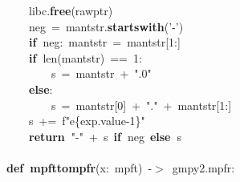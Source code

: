 \documentclass{article}\usepackage[]{graphicx}\usepackage[dvipsnames,table]{xcolor}
\makeatletter
\newcommand{\hlnum}[1]{\textcolor[rgb]{0.686,0.059,0.569}{#1}}%
\newcommand{\hlsng}[1]{\textcolor[rgb]{0.192,0.494,0.8}{#1}}%
\newcommand{\hlopt}[1]{\textcolor[rgb]{0,0,0}{#1}}%
\newcommand{\hldef}[1]{\textcolor[rgb]{0.345,0.345,0.345}{#1}}%
\newcommand{\hlkwa}[1]{\textcolor[rgb]{0.161,0.373,0.58}{\textbf{#1}}}%
\newcommand{\hlkwb}[1]{\textcolor[rgb]{0.69,0.353,0.396}{#1}}%
\newcommand{\hlkwd}[1]{\textcolor[rgb]{0.737,0.353,0.396}{\textbf{#1}}}%
\let\hlipl\hlkwb
\newenvironment{kframe}{%
 \def\at@end@of@kframe{}%
 \ifinner\ifhmode%
  \def\at@end@of@kframe{\end{minipage}}%
  \begin{minipage}{\columnwidth}%
 \fi\fi%
 \def\FrameCommand##1{\hskip\@totalleftmargin \hskip-\fboxsep
 \colorbox{shadecolor}{##1}\hskip-\fboxsep
     \hskip-\linewidth \hskip-\@totalleftmargin \hskip\columnwidth}%
 \MakeFramed {\advance\hsize-\width
   \@totalleftmargin\z@ \linewidth\hsize
   \@setminipage}}%
 {\par\unskip\endMakeFramed%
 \at@end@of@kframe}
\newenvironment{knitrout}{}{} %
\makeatother
\begin{document}
\begin{center}
\begin{minipage}[m]{15cm}
\begin{knitrout}
\begin{kframe}
\hldef{}\hldef{\ \ \ \ }\hldef{\textunderscore libc}\hlopt{.}\hldef{}\hlkwd{free}\hldef{}\hlopt{(}\hldef{raw\textunderscore ptr}\hlopt{)}\hspace*{\fill}\\
\hldef{}\hldef{\ \ \ \ }\hldef{neg\ }\hlopt{=\ }\hldef{mant\textunderscore str}\hlopt{.}\hldef{}\hlkwd{startswith}\hldef{}\hlopt{(}\hldef{}\hlsng{'{-}'}\hldef{}\hlopt{)}\hspace*{\fill}\\
\hldef{}\hldef{\ \ \ \ }\hldef{}\hlkwa{if\ }\hldef{neg}\hlopt{:\ }\hldef{mant\textunderscore str\ }\hlopt{=\ }\hldef{mant\textunderscore str}\hlopt{{[}}\hldef{}\hlnum{1}\hldef{}\hlopt{:{]}}\hspace*{\fill}\\
\hldef{}\hldef{\ \ \ \ }\hldef{}\hlkwa{if\ }\hldef{}\hlkwb{len}\hldef{}\hlopt{(}\hldef{mant\textunderscore str}\hlopt{)\ ==\ }\hldef{}\hlnum{1}\hldef{}\hlopt{:}\hspace*{\fill}\\
\hldef{}\hldef{\ \ \ \ \ \ \ \ }\hldef{s\ }\hlopt{=\ }\hldef{mant\textunderscore str\ }\hlopt{+\ }\hldef{}\hlsng{".0"}\hldef{}\hspace*{\fill}\\
\hldef{}\hldef{\ \ \ \ }\hldef{}\hlkwa{else}\hldef{}\hlopt{:}\hspace*{\fill}\\
\hldef{}\hldef{\ \ \ \ \ \ \ \ }\hldef{s\ }\hlopt{=\ }\hldef{mant\textunderscore str}\hlopt{{[}}\hldef{}\hlnum{0}\hldef{}\hlopt{{]}\ +\ }\hldef{}\hlsng{"."}\hldef{\ }\hlopt{+\ }\hldef{mant\textunderscore str}\hlopt{{[}}\hldef{}\hlnum{1}\hldef{}\hlopt{:{]}}\hspace*{\fill}\\
\hldef{}\hldef{\ \ \ \ }\hldef{s\ }\hlopt{+=\ }\hldef{f}\hlsng{"e}\hlipl{\{exp.value{-}1\}}\hlsng{"}\hldef{}\hspace*{\fill}\\
\hldef{}\hldef{\ \ \ \ }\hldef{}\hlkwa{return\ }\hldef{}\hlsng{"{-}"}\hldef{\ }\hlopt{+\ }\hldef{s\ }\hlkwa{if\ }\hldef{neg\ }\hlkwa{else\ }\hldef{s}\hspace*{\fill}\\
\hldef{}\hspace*{\fill}\\
\hldef{}\hlkwa{def\ }\hldef{}\hlkwd{mpf\textunderscore t\textunderscore to\textunderscore mpfr}\hldef{}\hlopt{(}\hldef{x}\hlopt{:\ }\hldef{mpf\textunderscore t}\hlopt{)\ {-}$>$\ }\hldef{gmpy2}\hlopt{.}\hldef{mpfr}\hlopt{:}\hspace*{\fill}\\

\end{kframe}
\end{knitrout}
\end{minipage}
\end{center}
\end{document}
